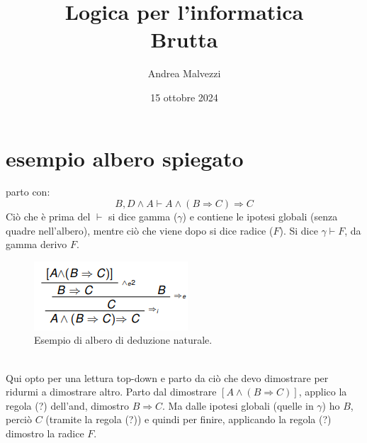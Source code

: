 \documentclass[12pt]{article}
\title{\textbf{Logica per l'informatica\\Brutta}}
\date{15 ottobre 2024}
\author{Andrea Malvezzi}
\begin{document}
\maketitle
\pagebreak
\tableofcontents
\pagebreak
\section{esempio albero spiegato}
parto con:
\begin{equation}
    B, D \wedge A \vdash A \wedge (B \Rightarrow C) \Rightarrow C \label{es:exp:albero_deduzione_naturale}
\end{equation}
Ciò che è prima del $\vdash$ si dice gamma ($\gamma$) e contiene le ipotesi globali (senza quadre nell'albero), mentre ciò che viene dopo si dice radice ($F$). Si dice $\gamma \vdash F$, da gamma derivo $F$.\\
\begin{figure}[!htb]
    \centering
    \includegraphics[width=.9\linewidth,height=.40\textheight,keepaspectratio]{brutta/albero_deduzione.png} %
    \begin{center}
        \caption{\label{fig:no_iniett_example}Esempio di albero di deduzione naturale.} %
    \end{center}
\end{figure}\\
Qui opto per una lettura top-down e parto da ciò che devo dimostrare per ridurmi a dimostrare altro. Parto dal dimostrare $[A \wedge (B \Rightarrow C)]$, applico la regola (?) dell'and, dimostro $B \Rightarrow C$. Ma dalle ipotesi globali (quelle in $\gamma$) ho $B$, perciò $C$ (tramite la regola (?)) e quindi per finire, applicando la regola (?) dimostro la radice $F$.
\pagebreak
\end{document}
